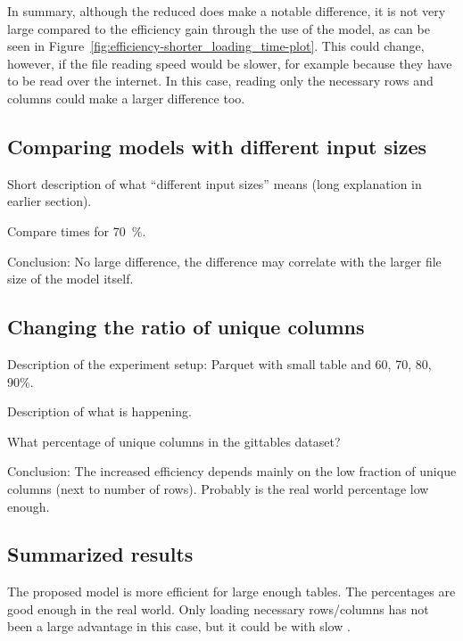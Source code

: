 In summary, although the reduced \io{} does make a notable difference, it is not very large compared to the efficiency gain through the use of the model, as can be seen in Figure~\ref{fig:efficiency-shorter_loading_time-plot}. This could change, however, if the file reading speed would be slower, for example because they have to be read over the internet. In this case, reading only the necessary rows and columns could make a larger difference too.




\subsection{Comparing models with different input sizes}\label{subsec:efficiency-comparing_models} %
Short description of what \enquote{different input sizes} means (long explanation in earlier section).

Compare times for \SI{70}{\percent}.

Conclusion: No large difference, the difference may correlate with the larger file size of the model itself.


\subsection{Changing the ratio of unique columns}\label{subsec:efficiency-changing_uniques} %
Description of the experiment setup: Parquet with small table and 60, 70, 80, 90\%.

Description of what is happening.

What percentage of unique columns in the gittables dataset?

Conclusion: The increased efficiency depends mainly on the low fraction of unique columns (next to number of rows). Probably is the real world percentage low enough.


\subsection{Summarized results}\label{subsec:efficiency-summarized_results} %
The proposed model is more efficient for large enough tables. The percentages are good enough in the real world. Only loading necessary rows/columns has not been a large advantage in this case, but it could be with slow \io{}.
